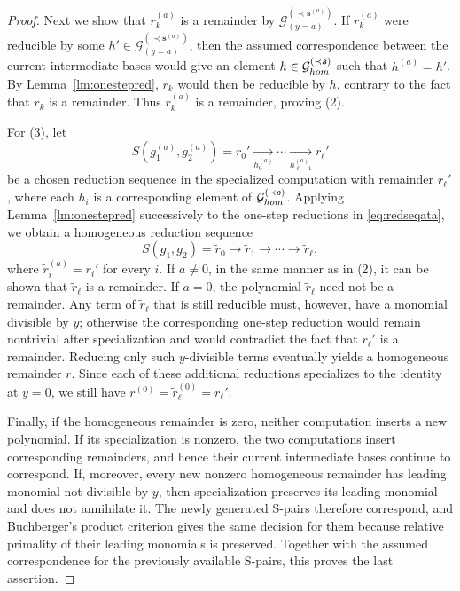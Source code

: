 \documentclass{article}
\theoremstyle{definition}
\theoremstyle{plain}
\theoremstyle{plain}
\theoremstyle{plain}
\theoremstyle{plain}
\numberwithin{equation}{subsection}
\begin{document}
\begin{proof}
Next we show that $r_k^{(a)}$ is a remainder by $\mathcal{G}^{(\prec \bm{s}^{(a)})}_{(y=a)}$.
If $r_k^{(a)}$ were reducible by some $h'\in\mathcal{G}^{(\prec \bm{s}^{(a)})}_{(y=a)}$, then the assumed correspondence between the current intermediate bases would give an element $h\in\mathcal{G}^{(\prec \bm{s})}_{\rm hom}$ such that $h^{(a)}=h'$.
By Lemma~\ref{lm:onestepred}, $r_k$ would then be reducible by $h$, contrary to the fact that $r_k$ is a remainder.
Thus $r_k^{(a)}$ is a remainder, proving {\rm (2)}.

\medskip

For {\rm (3)}, let
\begin{equation}\label{eq:redseqata}
S(g_1^{(a)},g_2^{(a)})=r_0' \xrightarrow[h_0^{(a)}]{} \cdots \xrightarrow[h_{\ell-1}^{(a)}]{} r_\ell'
\end{equation}
be a chosen reduction sequence in the specialized computation with remainder $r_\ell'$, where each $h_i$ is a corresponding element of $\mathcal{G}^{(\prec \bm{s})}_{\rm hom}$.
Applying Lemma~\ref{lm:onestepred} successively to the one-step reductions in \eqref{eq:redseqata}, we obtain a homogeneous reduction sequence
\begin{equation}\label{eq:redseqhom}
S(g_1,g_2)= \widetilde r_0 \longrightarrow \widetilde r_1 \longrightarrow \cdots \longrightarrow \widetilde r_\ell,
\end{equation}
where $\widetilde r_i^{(a)}=r_i'$ for every $i$.
If $a\neq0$, in the same manner as in (2), it can be shown that $\widetilde r_\ell$ is a remainder.
If $a=0$, the polynomial $\widetilde r_\ell$ need not be a remainder.
Any term of $\widetilde r_\ell$ that is still reducible must, however, have a monomial divisible by $y$; otherwise the corresponding one-step reduction would remain nontrivial after specialization and would contradict the fact that $r_\ell'$ is a remainder.
Reducing only such $y$-divisible terms eventually yields a homogeneous remainder $r$.
Since each of these additional reductions specializes to the identity at $y=0$, we still have $r^{(0)}= \widetilde r_\ell^{(0)}= r_\ell'$.

\medskip

Finally, if the homogeneous remainder is zero, neither computation inserts a new polynomial.
If its specialization is nonzero, the two computations insert corresponding remainders, and hence their current intermediate bases continue to correspond.
If, moreover, every new nonzero homogeneous remainder has leading monomial not divisible by $y$, then specialization preserves its leading monomial and does not annihilate it.
The newly generated S-pairs therefore correspond, and Buchberger's product criterion gives the same decision for them because relative primality of their leading monomials is preserved.
Together with the assumed correspondence for the previously available S-pairs, this proves the last assertion.
\end{proof}
\end{document}
